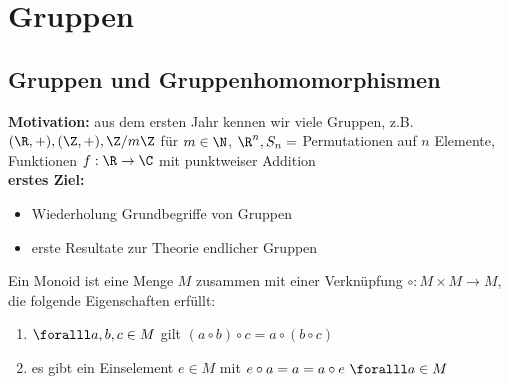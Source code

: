 \chapter{Gruppen}\lecture

\section{Gruppen und Gruppenhomomorphismen}

\textbf{Motivation:} aus dem ersten Jahr kennen wir viele Gruppen, z.B. $(\R,+), (\Z,+), \Z/m\Z$ für $m \in \N$, $\R^n, S_n = $ Permutationen auf $n$ Elemente, Funktionen $f: \R \to \C$ mit punktweiser Addition\\
\textbf{erstes Ziel:}
    \begin{itemize}
        \item Wiederholung Grundbegriffe von Gruppen
        \item erste Resultate zur Theorie endlicher Gruppen
    \end{itemize}

\begin{defn}[Monoid]
    Ein Monoid ist eine Menge $M$ zusammen mit einer Verknüpfung $\circ: M \times M \to M$, die folgende Eigenschaften erfüllt:
    \begin{enumerate}[label={\roman*})]
        \item $\foralll a,b,c \in M$ gilt $(a \circ b) \circ c = a \circ (b \circ c)$
        \item es gibt ein Einselement $e \in M$ mit $e \circ a = a = a \circ e \ \foralll a \in M$
    \end{enumerate}
\end{defn}